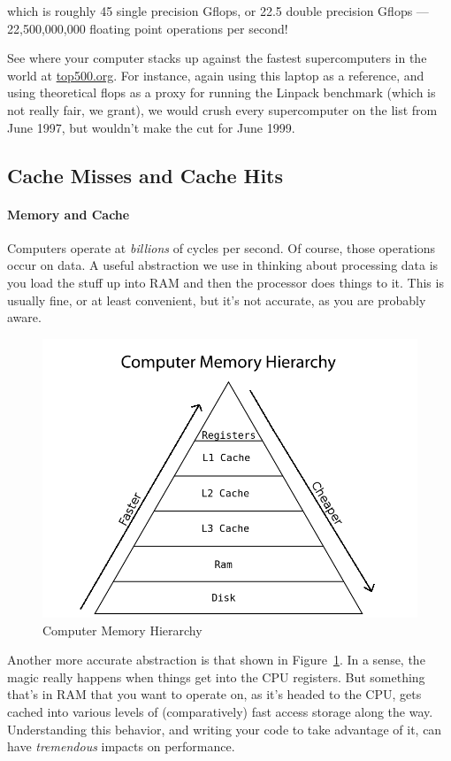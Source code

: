 which is roughly 45 single precision Gflops, or 22.5 double precision Gflops 
--- 22,500,000,000 floating point operations per second!

See where your computer stacks up against the fastest supercomputers in the 
world at \href{http://www.top500.org/}{top500.org}.  For instance, again using 
this laptop as a reference, and using theoretical flops as a proxy for running 
the Linpack benchmark (which is not really fair, we grant), we would crush 
every supercomputer on the list from June 1997, but wouldn't make the cut for 
June 1999.



\subsection{Cache Misses and Cache Hits}

\paragraph{Memory and Cache}

Computers operate at \emph{billions} of cycles per second.  Of course, those  
operations occur on data.  A useful abstraction we use in thinking about 
processing data is you load the stuff up into RAM and then the processor does 
things to it.  This is usually fine, or at least convenient, but it's not 
accurate, as you are probably aware.  

\begin{figure}[ht]
  \centering
  \includegraphics[scale=.54]{./include/pics/memory}
  \caption{Computer Memory Hierarchy}
  \label{fig:mem}
\end{figure}
Another more accurate abstraction is that shown in Figure~\ref{fig:mem}.  In a 
sense, the magic really happens when things get into the CPU registers.  But 
something that's in RAM that you want to operate on, as it's headed to the CPU, 
gets cached into various levels of (comparatively) fast access storage along 
the way.  Understanding this behavior, and writing your code to take advantage 
of it, can have \emph{tremendous} impacts on performance.


